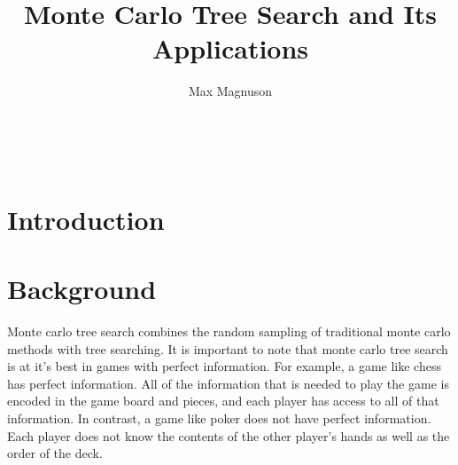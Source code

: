 \documentclass{sig-alternate}
\begin{document}

\title{Monte Carlo Tree Search and Its Applications}


\author{
\alignauthor
Max Magnuson\\
	\\
	\\
	\\
}

\maketitle
\begin{abstract}

\end{abstract}


\section{Introduction} 

\section{Background}
Monte carlo tree search combines the random sampling of traditional monte carlo methods with tree searching. It is important to note that monte carlo tree search is at it's best in games with perfect information. For example, a game like chess has perfect information. All of the information that is needed to play the game is encoded in the game board and pieces, and each player has access to all of that information. In contrast, a game like poker does not have perfect information. Each player does not know the contents of the other player's hands as well as the order of the deck.
\end{document}
